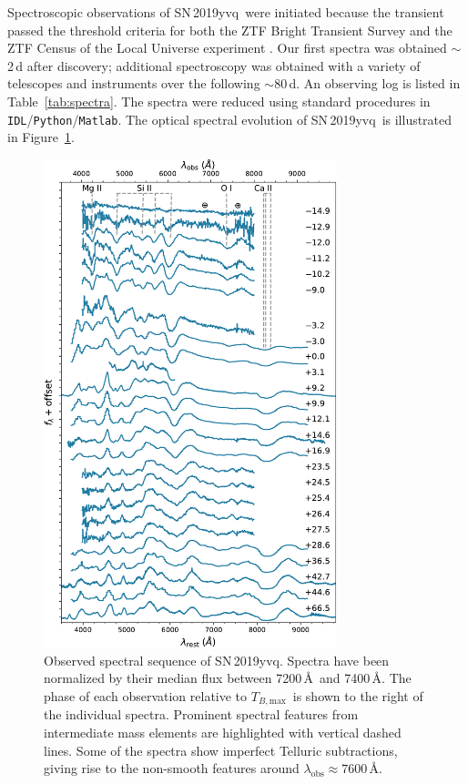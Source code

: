 \documentclass[twocolumn]{aastex63}
\newcommand{\tbmax}{$T_{B,\mathrm{max}}$}
\newcommand{\sn}{SN\,2019yvq}
\begin{document}
Spectroscopic observations of \sn\ were initiated because the transient passed
the threshold criteria for both the ZTF Bright Transient Survey
\citep{Fremling19a} and the ZTF Census of the Local Universe experiment
\citep{De20}. Our first spectra was obtained $\sim$2\,d after discovery;
additional spectroscopy was obtained with a variety of telescopes and
instruments over the following $\sim$80\,d. An observing log is listed in
Table~\ref{tab:spectra}. The spectra were reduced using standard procedures in
\texttt{IDL}/\texttt{Python}/\texttt{Matlab}. The optical spectral evolution
of \sn\ is illustrated in Figure~\ref{fig:spec_evo}.



\begin{figure}
    \centering
    \includegraphics[width=3.35in]{./figures/spec_evo.pdf}
    \caption{Observed spectral sequence of \sn. Spectra have been normalized
    by their median flux between 7200\,\AA\ and 7400\,\AA. The phase of each
    observation relative to \tbmax\ is shown to the right of the individual
    spectra. Prominent spectral features from intermediate mass elements are
    highlighted with vertical dashed lines. Some of the spectra show
    imperfect Telluric subtractions, giving rise to the non-smooth features
    around $\lambda_\mathrm{obs} \approx 7600$\,\AA.}
    \label{fig:spec_evo}
\end{figure}
\end{document}
